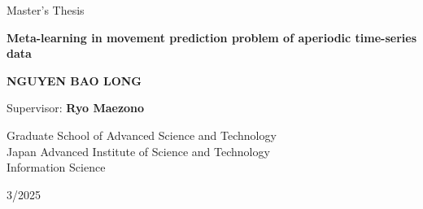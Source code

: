 \begin{titlepage}

\begin{center}

{
    \vfill
    \large Master's Thesis\\[3cm]
}

{
    \LARGE \bfseries Meta-learning in movement prediction problem of aperiodic time-series data\\[3cm]
}

{
    \large \bfseries NGUYEN BAO LONG\\[1.5cm]
}


{
    Supervisor: \textbf{Ryo Maezono}\\[2cm]
}

\vfill

Graduate School of Advanced Science and Technology\\
Japan Advanced Institute of Science and Technology\\
Information Science

\vfill

3/2025


\end{center}


    
    
    

\end{titlepage}
